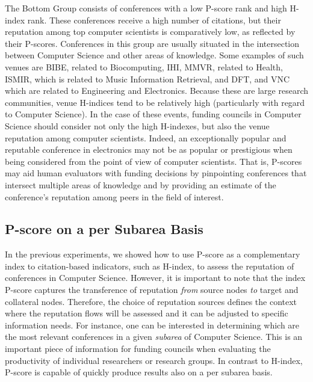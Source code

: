\documentclass[notitlepage]{svjour3}
\begin{document}
The Bottom Group consists of conferences with a low P-score rank and high H-index rank. These conferences
receive a high number of citations, but their reputation among top computer scientists is comparatively low, 
as reflected by their P-scores. Conferences in this
group are usually situated in the intersection between Computer Science and other areas of knowledge. Some examples of such venues are
BIBE, related to Biocomputing, IHI, MMVR, related to Health, ISMIR, which is related to Music Information Retrieval, and
DFT, and VNC which are related to Engineering and Electronics. Because these are large research communities, venue H-indices tend to be 
relatively high (particularly with regard to Computer Science). In the case of these events, funding councils in Computer Science should consider not only the high H-indexes, but also the venue reputation among computer
scientists. Indeed, an exceptionally popular and reputable conference in electronics may not be as 
popular or prestigious when being considered from the point of view of computer scientists. That is, P-scores may aid 
human evaluators with funding decisions by pinpointing conferences that intersect multiple areas of knowledge and by providing
an estimate of the conference's reputation among peers in the field of interest.

\subsection{P-score on a per Subarea Basis}

In the previous experiments, we showed how to use P-score as a complementary index to citation-based indicators, such as H-index, to assess the reputation of conferences in Computer Science. However, it is important to note that the index P-score captures the transference of reputation \textit{from} source nodes \textit{to} target and collateral nodes. Therefore, the choice of reputation sources defines the context where the reputation flows will be assessed and it can be adjusted to specific information needs. For instance, %
one can be interested in determining which are the most relevant conferences in a given \textit{subarea} of Computer Science. This is an important piece of information for funding councils when evaluating the productivity of individual researchers or research groups. In contrast to H-index, P-score is capable of quickly produce results also on a per subarea basis. %
\end{document}
